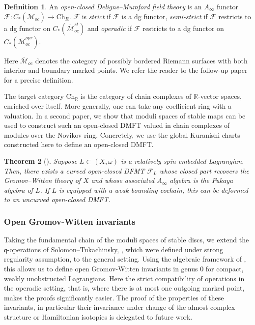 \documentclass[11pt,psamsfonts, oneside, reqno]{amsart}
\newcommand{\sub}{\subset}%
\newcommand{\cl}{\colon}
\newcommand{\scF}{\mathscr{F}}
\newcommand{\Mbar}{\overline{\mathcal M}}
\newcommand{\bR}{\mathbb{R}}
\newcommand{\fq}{\mathfrak{q}}
\newtheorem{theorem}{Theorem}[section]
\theoremstyle{definition}
\newtheorem{definition}[theorem]{Definition}
\theoremstyle{remark}
\numberwithin{equation}{section}
\begin{document}
\begin{definition}\label{}
	An \emph{open-closed Deligne--Mumford field theory} is an $A_\infty$ functor $\scF\cl C_{*}(\Mbar_{oc})\to \text{Ch}_R$. $\scF$ is \emph{strict} if $\scF$ is a dg functor, \emph{semi-strict} if $\scF$ restricts to a dg functor on $C_*(\Mbar^{st}_{oc})$ and \emph{operadic} if $\scF$ restricts to a dg functor on $C_*(\Mbar^{opr}_{oc})$.
\end{definition}
\noindent
Here $\Mbar_{oc}$ denotes the category of possibly bordered Riemann surfaces with both interior and boundary marked points. We refer the reader to the follow-up paper \cite{HH1} for a precise definition. 

The target category $\text{Ch}_\bR$ is the category of chain complexes of $\bR$-vector spaces, enriched over itself. More generally, one can take any coefficient ring with a valuation. In a second paper, we show that moduli spaces of stable maps can be used to construct such an open-closed DMFT valued in chain complexes of modules over the Novikov ring. Concretely, we use the global Kuranishi charts constructed here to define an open-closed DMFT.

\begin{theorem}[\cite{HH1}]
	\label{thm:OCDMFT associated to L}
	Suppose $L \sub (X,\omega)$ is a relatively spin embedded Lagrangian. Then, there exists a curved open-closed DFMT $\scF_L$ whose closed part recovers the Gromov--Witten theory of $X$ and whose associated $A_\infty$ algebra is the Fukaya algebra of $L$. If $L$ is equipped with a weak bounding cochain, this can be deformed to an uncurved open-closed DMFT.
\end{theorem}


\subsubsection{Open Gromov-Witten invariants}
Taking the fundamental chain of the moduli spaces of stable discs, we extend the $\fq$-operations of Solomon--Tukachinsky, \cite{ST16}, which were defined under strong regularity assumption, to the general setting. Using the algebraic framework of \cite{ST1}, this allows us to define open Gromov-Witten invariants in genus $0$ for compact, weakly unobstructed Lagrangians. Here the strict compatibility of operations in the operadic setting, that is, where there is at most one outgoing marked point, makes the proofs significantly easier. The proof of the properties of these invariants, in particular their invariance under change of the almost complex structure or Hamiltonian isotopies is delegated to future work.
\end{document}

